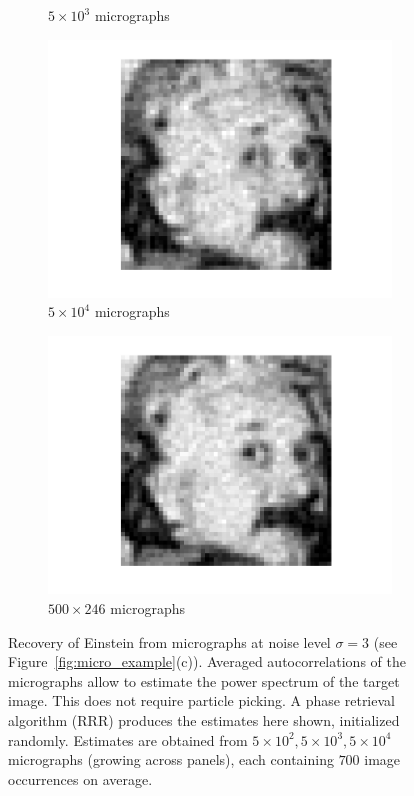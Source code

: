 \documentclass[9pt,twocolumn,twoside,lineno]{pnas-new}
\begin{document}
\begin{figure}[h]
\begin{subfigure}[h]{0.24\textwidth}
	\caption{$5\times 10^3$ micrographs}
\end{subfigure} 
	\begin{subfigure}[h]{0.24\textwidth}
		\centering
		\includegraphics[scale=0.35]{Einstien_progress_100}
		\caption{$5\times 10^4$ micrographs}
	\end{subfigure} 
	\begin{subfigure}[h]{0.24\textwidth}
		\centering
		\includegraphics[scale=0.35]{Einstien_progress_246}
		\caption{$500\times 246$ micrographs}
	\end{subfigure}
	\caption{\label{fig:Einst_example} Recovery of Einstein from micrographs at noise level $\sigma = 3$ (see Figure~\ref{fig:micro_example}(c)). Averaged autocorrelations of the micrographs allow to estimate the power spectrum of the target image. This does not require particle picking. A phase retrieval algorithm (RRR) produces the estimates here shown, initialized randomly. Estimates are obtained from $5\times 10^2,5\times 10^3,5\times 10^4$ micrographs (growing across panels), each containing $700$ image occurrences on average. }	
\end{figure}
\end{document}
